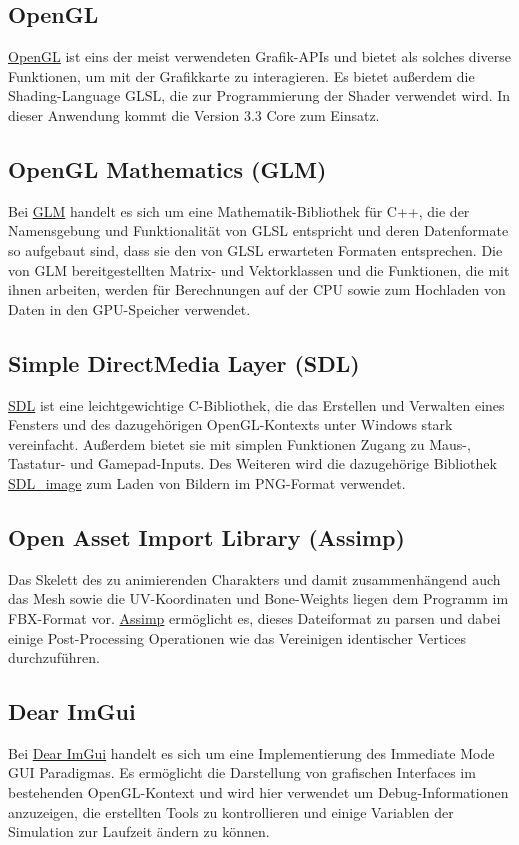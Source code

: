 \subsection{OpenGL}
\href{https://www.opengl.org/}{OpenGL} ist eins der meist verwendeten Grafik-APIs und bietet als solches diverse Funktionen, um mit der Grafikkarte zu interagieren. Es bietet außerdem die Shading-Language GLSL, die zur Programmierung der Shader verwendet wird. In dieser Anwendung kommt die Version 3.3 Core zum Einsatz.

\subsection{OpenGL Mathematics (GLM)}
Bei \href{https://glm.g-truc.net/0.9.9/index.html}{GLM} handelt es sich um eine Mathematik-Bibliothek für C++, die der Namensgebung und Funktionalität von GLSL entspricht und deren Datenformate so aufgebaut sind, dass sie den von GLSL erwarteten Formaten entsprechen. Die von GLM bereitgestellten Matrix- und Vektorklassen und die Funktionen, die mit ihnen arbeiten, werden für Berechnungen auf der CPU sowie zum Hochladen von Daten in den GPU-Speicher verwendet.

\subsection{Simple DirectMedia Layer (SDL)}
\href{https://www.libsdl.org/index.php}{SDL} ist eine leichtgewichtige C-Bibliothek, die das Erstellen und Verwalten eines Fensters und des dazugehörigen OpenGL-Kontexts unter Windows stark vereinfacht. Außerdem bietet sie mit simplen Funktionen Zugang zu Maus-, Tastatur- und Gamepad-Inputs. Des Weiteren wird die dazugehörige Bibliothek \href{https://www.libsdl.org/projects/SDL_image/}{SDL\_image} zum Laden von Bildern im PNG-Format verwendet.

\subsection{Open Asset Import Library (Assimp)}
Das Skelett des zu animierenden Charakters und damit zusammenhängend auch das Mesh sowie die UV-Koordinaten und Bone-Weights liegen dem Programm im FBX-Format vor. \href{http://assimp.org/}{Assimp} ermöglicht es, dieses Dateiformat zu parsen und dabei einige Post-Processing Operationen wie das Vereinigen identischer Vertices durchzuführen.

\subsection{Dear ImGui}
Bei \href{https://github.com/ocornut/imgui}{Dear ImGui} handelt es sich um eine Implementierung des Immediate Mode GUI Paradigmas. Es ermöglicht die Darstellung von grafischen Interfaces im bestehenden OpenGL-Kontext und wird hier verwendet um Debug-Informationen anzuzeigen, die erstellten Tools zu kontrollieren und einige Variablen der Simulation zur Laufzeit ändern zu können.

